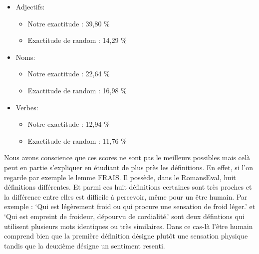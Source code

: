 \begin{itemize}
 \item {Adjectifs:
	\begin{itemize}
	 \item Notre exactitude : 39,80 \%
	 \item Exactitude de random : 14,29 \%
	\end{itemize}
	}
 \item {Noms:
 	\begin{itemize}
	 \item Notre exactitude : 22,64 \%
	 \item Exactitude de random : 16,98 \%
	\end{itemize}
	}
 \item {Verbes:
 	\begin{itemize}
	 \item Notre exactitude : 12,94 \%
	 \item Exactitude de random : 11,76 \%
	\end{itemize}
	}
\end{itemize}

Nous avons conscience que ces scores ne sont pas le meilleurs possibles mais 
celà peut en partie s'expliquer en étudiant de plus près les définitions. En 
effet, si l'on regarde par exemple le lemme FRAIS. Il possède, dans le 
RomansEval, huit définitions différentes. Et parmi ces huit définitions 
certaines sont très proches et la différence entre elles est difficile à 
percevoir, même pour un être humain. Par exemple : `Qui est légèrement froid ou 
qui procure une sensation de froid léger.' et `Qui est empreint de froideur, 
dépourvu de cordialité.' sont deux défintions qui utilisent plusieurs mots 
identiques ou très similaires. Dans ce cas-là l'être humain comprend bien que la 
première définition désigne plutôt une sensation physique tandis que la deuxième 
désigne un sentiment resenti.
